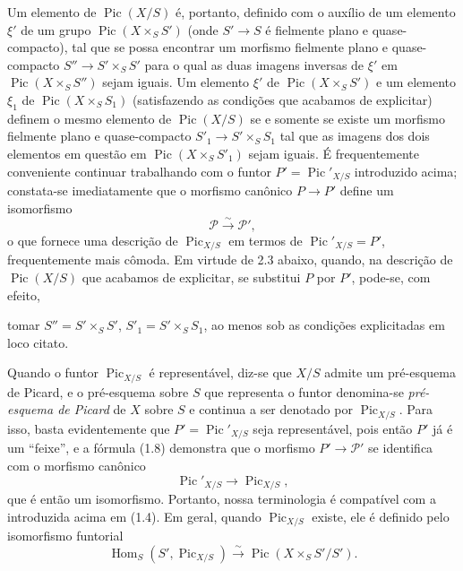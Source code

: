 \documentclass[11pt,twoside,openany]{book}
\numberwithin{equation}{section}
\newcommand{\src}[1]{%
  \phantomsection\hypertarget{src:#1}{}%
  \marginpar{\raggedleft\footnotesize\sffamily #1}%
}
\theoremstyle{plain}
\theoremstyle{definition}
\theoremstyle{remark}
\newcommand{\FgaUnitKey}{frontmatter}
\renewcommand{\src}[1]{%
  \phantomsection\hypertarget{src:\FgaUnitKey:#1}{}%
  \marginpar{\raggedleft\footnotesize\sffamily #1}%
}
\begin{document}
Um elemento de $\operatorname{Pic}(X/S)$ é, portanto, definido com o auxílio de
um elemento $\xi'$ de um grupo $\operatorname{Pic}(X\times_SS')$ (onde
$S'\longrightarrow S$ é fielmente plano e quase-compacto), tal que se possa
encontrar um morfismo fielmente plano e quase-compacto
$S''\longrightarrow S'\times_SS'$ para o qual as duas imagens inversas de
$\xi'$ em $\operatorname{Pic}(X\times_SS'')$ sejam iguais. Um elemento $\xi'$
de $\operatorname{Pic}(X\times_SS')$ e um elemento $\xi_1$ de
$\operatorname{Pic}(X\times_SS_1)$ (satisfazendo as condições que acabamos de
explicitar) definem o mesmo elemento de $\operatorname{Pic}(X/S)$ se e somente
se existe um morfismo fielmente plano e quase-compacto
$S'_1\longrightarrow S'\times_SS_1$ tal que as imagens dos dois elementos em
questão em $\operatorname{Pic}(X\times_SS'_1)$ sejam iguais. É frequentemente
conveniente continuar trabalhando com o funtor
$P'=\operatorname{Pic}'_{X/S}$ introduzido acima; constata-se imediatamente que
o morfismo canônico $P\longrightarrow P'$ define um isomorfismo
\begin{equation}
\mathcal P\xrightarrow{\sim}\mathcal P',
\tag{1.8}
\end{equation}
o que fornece uma descrição de $\operatorname{Pic}_{X/S}$ em termos de
$\operatorname{Pic}'_{X/S}=P'$, frequentemente mais cômoda. Em virtude de 2.3
abaixo, quando, na descrição de $\operatorname{Pic}(X/S)$ que acabamos de
explicitar, se substitui $P$ por $P'$, pode-se, com efeito,
\src{146}
tomar $S''=S'\times_SS'$, $S'_1=S'\times_SS_1$, ao menos sob as condições
explicitadas em loco citato.

Quando o funtor $\operatorname{Pic}_{X/S}$ é representável, diz-se que $X/S$
admite um pré-esquema de Picard, e o pré-esquema sobre $S$ que representa o
funtor denomina-se \emph{pré-esquema de Picard} de $X$ sobre $S$ e continua a
ser denotado por $\operatorname{Pic}_{X/S}$. Para isso, basta evidentemente que
$P'=\operatorname{Pic}'_{X/S}$ seja representável, pois então $P'$ já é um
``feixe'', e a fórmula (1.8) demonstra que o morfismo
$P'\longrightarrow\mathcal P'$ se identifica com o morfismo canônico
\begin{equation}
\operatorname{Pic}'_{X/S}\longrightarrow\operatorname{Pic}_{X/S},
\tag{1.9}
\end{equation}
que é então um isomorfismo. Portanto, nossa terminologia é compatível com a
introduzida acima em (1.4). Em geral, quando $\operatorname{Pic}_{X/S}$ existe,
ele é definido pelo isomorfismo funtorial
\begin{equation}
\operatorname{Hom}_S(S',\operatorname{Pic}_{X/S})\xrightarrow{\sim}
\operatorname{Pic}(X\times_SS'/S').
\tag{1.10}
\end{equation}
\end{document}
